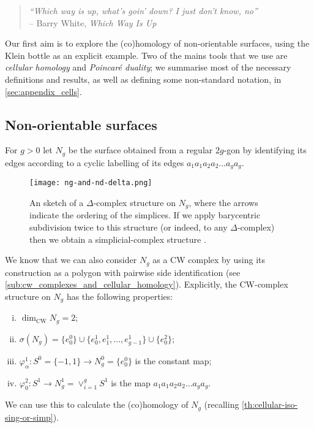\documentclass[12pt]{article}
\numberwithin{equation}{subsection}
\numberwithin{theorem}{subsection}
\numberwithin{lemma}{subsection}
\numberwithin{corollary}{subsection}
\numberwithin{definition}{subsection}
\numberwithin{example}{subsection}
\numberwithin{note}{subsection}
\begin{document}
        \begin{quotation}
            \raggedleft
            \emph{``Which way is up, what's goin' down? I just don't know, no''}\\
            -- Barry White, \emph{Which Way Is Up}
        \end{quotation}

        Our first aim is to explore the (co)homology of non-orientable surfaces, using the Klein bottle as an explicit example.
        Two of the mains tools that we use are \emph{cellular homology} and \emph{Poincaré duality}; we summarise most of the necessary definitions and results, as well as defining some non-standard notation, in \cref{sec:appendix_cells}.

        \subsection{Non-orientable surfaces} %
        \label{sub:non_orientable_surfaces}

            \begin{definition}
                For $g>0$ let $N_g$ be the surface obtained from a regular $2g$-gon by identifying its edges according to a cyclic labelling of its edges $a_1a_1a_2a_2\ldots a_ga_g$.
            \end{definition}

            \begin{figure}[ht]
                \centering
                \texttt{[image: ng-and-nd-delta.png]}
                \caption{An sketch of a $\Delta$-complex structure on $N_g$, where the arrows indicate the ordering of the simplices. If we apply barycentric subdivision twice to this structure (or indeed, to any $\Delta$-complex) then we obtain a simplicial-complex structure \cite[Exercise~23,~\S2.1]{hatcher2002algebraic}.}\label{fg:ng-and-nd-delta}
            \end{figure}

            We know that we can also consider $N_g$ as a CW complex by using its construction as a polygon with pairwise side identification (see \cref{sub:cw_complexes_and_cellular_homology}).
            Explicitly, the CW-complex structure on $N_g$ has the following properties:
            \begin{enumerate}[(i)]
                \item $\dim_\text{CW}N_g=2$;
                \item $\sigma(N_g) = \{e_0^0\} \cup \{e_0^1,e_1^1,\ldots,e_{g-1}^1\} \cup \{e_0^2\}$;
                \item $\varphi_\alpha^1\colon S^0=\{-1,1\}\to N_g^0=\{e_0^0\}$ is the constant map;
                \item $\varphi_0^2\colon S^1\to N_g^1=\vee_{i=1}^g S^1$ is the map $a_1a_1a_2a_2\ldots a_ga_g$.
            \end{enumerate}
            We can use this to calculate the (co)homology of $N_g$ (recalling \cref{th:cellular-iso-sing-or-simp}).
\end{document}
